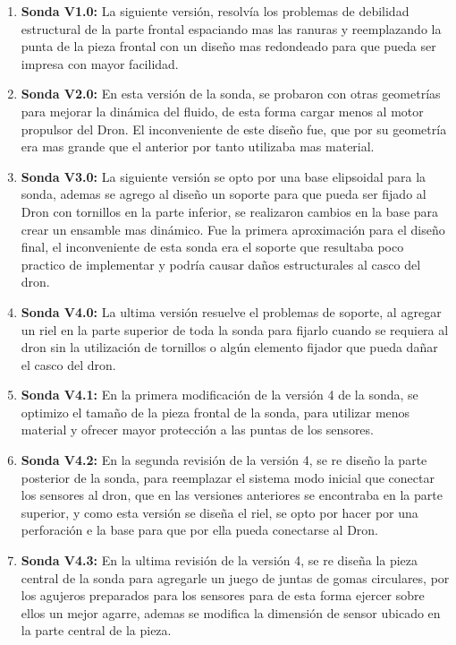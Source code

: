 \begin{appendices}
\begin{enumerate}
\item \textbf{Sonda V1.0:} La siguiente versión, resolvía los problemas de debilidad estructural de la parte frontal espaciando mas las ranuras y reemplazando la punta de la pieza frontal con un diseño mas redondeado para que pueda ser impresa con mayor facilidad.   
\item \textbf{Sonda V2.0:} En esta versión de la sonda, se probaron con otras geometrías para mejorar la dinámica del fluido, de esta forma cargar menos al motor propulsor del Dron. El inconveniente de este diseño fue, que por su geometría era mas grande que el anterior por tanto utilizaba mas material.
\item \textbf{Sonda V3.0:} La siguiente versión se opto por una base elipsoidal para la sonda, ademas se agrego al diseño un soporte para que pueda ser fijado al Dron con tornillos en la parte inferior, se realizaron cambios en la base para crear un ensamble mas dinámico. Fue la primera aproximación para el diseño final, el inconveniente de esta sonda era el soporte que resultaba poco practico de implementar y podría causar daños estructurales al casco del dron.
\item \textbf{Sonda V4.0:} La ultima versión resuelve el problemas de soporte, al agregar un riel en la parte superior de toda la sonda para fijarlo cuando se requiera al dron sin la utilización de tornillos o algún elemento fijador que pueda dañar el casco del dron.
\item \textbf{Sonda V4.1:} En la primera modificación de la versión 4 de la sonda, se optimizo el tamaño de la pieza frontal de la sonda,  para utilizar menos material y ofrecer mayor protección a las puntas de los sensores.
\item \textbf{Sonda V4.2:} En la segunda revisión de la versión 4, se re diseño la parte posterior de la sonda, para reemplazar el sistema modo inicial que conectar los sensores al dron, que en las versiones anteriores se encontraba en la parte superior, y como esta versión se diseña el riel, se opto por hacer por una perforación e la base para que por ella pueda conectarse al Dron.
\item \textbf{Sonda V4.3:} En la ultima revisión de la versión 4, se re diseña la pieza central de la sonda para agregarle un juego de juntas de gomas circulares, por los agujeros preparados para los sensores para de esta forma ejercer sobre ellos un mejor agarre, ademas se modifica la dimensión de sensor ubicado en la parte central de la pieza.
\end{enumerate}



\end{appendices}
